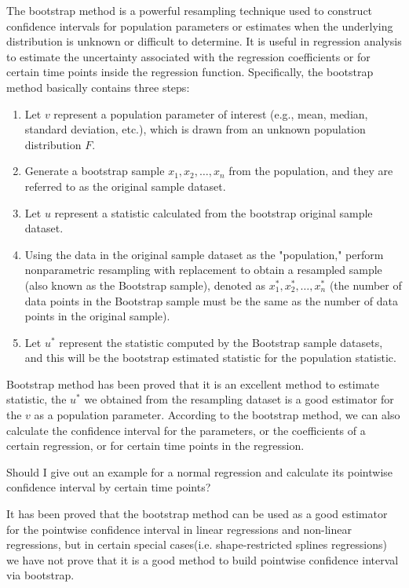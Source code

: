 \documentclass[12pt]{article}
\begin{document}
The bootstrap method is a powerful resampling technique used to construct confidence intervals for population parameters or estimates when the underlying distribution is unknown or difficult to determine. It is useful in regression analysis to estimate the uncertainty associated with the regression coefficients or for certain time points inside the regression function. Specifically, the bootstrap method basically contains three steps:

\begin{enumerate}[label=\arabic*.]
    \item Let \(v\) represent a population parameter of interest (e.g., mean, median, standard deviation, etc.), which is drawn from an unknown population distribution \(F\).
    \item Generate a bootstrap sample \(x_1, x_2, \ldots, x_n\) from the population, and they are referred to as the original sample dataset.
    \item Let \(u\) represent a statistic calculated from the bootstrap original sample dataset.
    \item Using the data in the original sample dataset as the "population," perform nonparametric resampling with replacement to obtain a resampled sample (also known as the Bootstrap sample), denoted as \(x_1^*, x_2^*, \ldots, x_n^*\) (the number of data points in the Bootstrap sample must be the same as the number of data points in the original sample).
    \item Let \(u^*\) represent the statistic computed by the Bootstrap sample datasets, and this will be the bootstrap estimated statistic for the population statistic.

\end{enumerate}

Bootstrap method has been proved that it is an excellent method to estimate statistic, the \(u^*\) we obtained from the resampling dataset is a good estimator for the \(v\) as a population parameter. According to the bootstrap method, we can also calculate the confidence interval for the parameters, or the coefficients of a certain regression, or for certain time points in the regression.



Should I give out an example for a normal regression and calculate its pointwise confidence interval by certain time points?

It has been proved that the bootstrap method can be used as a good estimator for the pointwise confidence interval in linear regressions and non-linear regressions, but in certain special cases(i.e. shape-restricted splines regressions) we have not prove that it is a good method to build pointwise confidence interval via bootstrap.
\end{document}
